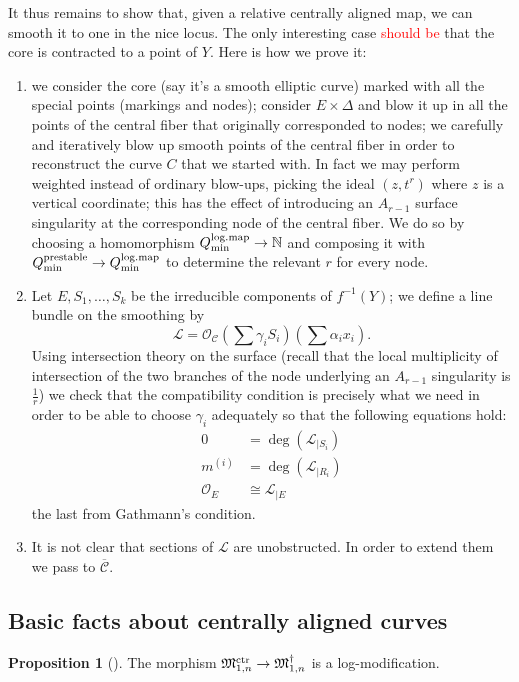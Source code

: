 \documentclass[11pt]{amsart}
\newcommand{\OO}{\mathcal{O}}
\renewcommand{\to}{\rightarrow}
\newcommand{\cC}{\mathcal C}
\newcommand{\MM}{\mathfrak M}
\newcommand{\dvr}{\Delta}
\theoremstyle{definition}
\newtheorem{prop}[thm]{Proposition}
\theoremstyle{definition}
\begin{document}
It thus remains to show that, given a relative centrally aligned map, we can smooth it to one in the nice locus. The only interesting case \textcolor{red}{should be} that the core is contracted to a point of $Y$. Here is how we prove it:
\begin{enumerate}
 \item we consider the core (say it's a smooth elliptic curve) marked with all the special points (markings and nodes); consider $E\times\dvr$ and blow it up in all the points of the central fiber that originally corresponded to nodes; we carefully and iteratively blow up smooth points of the central fiber in order to reconstruct the curve $C$ that we started with. In fact we may perform weighted instead of ordinary blow-ups, picking the ideal $(z,t^r)$ where $z$ is a vertical coordinate; this has the effect of introducing an $A_{r-1}$ surface singularity at the corresponding node of the central fiber. We do so by choosing a homomorphism $Q_{\rm{min}}^{\rm{log.map}}\to\mathbb N$ and composing it with $Q_{\rm{min}}^{\rm{prestable}}\to Q_{\rm{min}}^{\rm{log.map}}$ to determine the relevant $r$ for every node.
 \item Let $E,S_1,\ldots,S_k$ be the irreducible components of $f^{-1}(Y)$; we define a line bundle on the smoothing by
 \[\mathcal L=\OO_{\cC}\left(\sum \gamma_iS_i\right)\left(\sum \alpha_ix_i\right).\]
 Using intersection theory on the surface (recall that the local multiplicity of intersection of the two branches of the node underlying an $A_{r-1}$ singularity is $\frac{1}{r}$) we check that the compatibility condition is precisely what we need in order to be able to choose $\gamma_i$ adequately so that the following equations hold:
 \begin{align*}
  0&=\deg(\mathcal L_{|S_i}) \\
  m^{(i)}&=\deg(\mathcal L_{|R_i}) \\
  \mathcal O_E&\cong\mathcal L_{|E}
 \end{align*}
 the last from Gathmann's condition.
 \item It is not clear that sections of $\mathcal L$ are unobstructed. In order to extend them we pass to $\overline{\mathcal C}$.
\end{enumerate}

\subsection{Basic facts about centrally aligned curves}
\begin{prop}[{\cite[Proposition 4.6.2.2]{RSPW}}]
The morphism $\MM^{\rm{ctr}}_{1,n}\to\MM^{\dagger}_{1,n}$ is a log-modification.
\end{prop}
\end{document}

